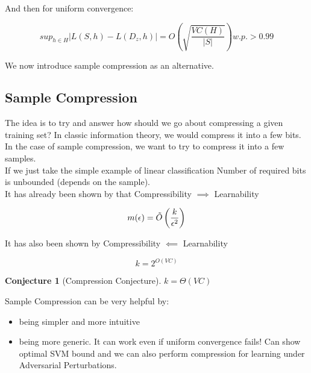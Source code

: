 \documentclass{article}
\newtheorem{conjecture}{Conjecture}
\begin{document}
\noindent And then for uniform convergence:

\begin{equation}
    sup_{h \in H} |L(S,h) - L(D_z,h)| = O \left( \sqrt{\frac{VC(H)}{|S|}} \right) w.p. > 0.99
\end{equation}

We now introduce sample compression as an alternative.

\subsection{Sample Compression}

\noindent The idea is to try and answer how should we go about compressing a given training set? In classic information theory, we would compress it into a few bits. In the case of sample compression, we want to try to compress it into a few samples.\\

\noindent If we just take the simple example of linear classification Number of required bits is unbounded (depends on the sample).\\

\noindent It has already been shown by \citet{littlestone1986relating} that Compressibility $\implies$ Learnability

\begin{equation*}
    m(\epsilon)=\Tilde{O} \left( \frac{k}{\epsilon^2} \right)
\end{equation*}

\noindent It has also been shown by \citet{moran2016sample} Compressibility $\impliedby$ Learnability

\begin{equation*}
    k = 2^{O(VC)}
\end{equation*}

\begin{conjecture}[Compression Conjecture]
    $k = \Theta(VC)$
\end{conjecture}

\noindent Sample Compression can be very helpful by:

\begin{itemize}
    \item being simpler and more intuitive
    \item being more generic. It can work even if uniform convergence fails! Can show optimal SVM bound and we can also perform compression for learning under Adversarial Perturbations.
\end{itemize}
\end{document}
